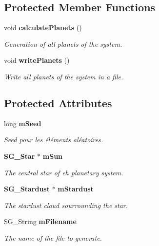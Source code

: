 \subsection*{Protected Member Functions}
\begin{CompactItemize}
\item 
void {\bf calculate\-Planets} ()\label{class_s_g___solar_system_b0}

\begin{CompactList}\small\item\em Generation of all planets of the system. \item\end{CompactList}\item 
void {\bf write\-Planets} ()\label{class_s_g___solar_system_b1}

\begin{CompactList}\small\item\em Write all planets of the system in a file. \item\end{CompactList}\end{CompactItemize}
\subsection*{Protected Attributes}
\begin{CompactItemize}
\item 
long {\bf m\-Seed}\label{class_s_g___solar_system_p0}

\begin{CompactList}\small\item\em Seed pour les \'{e}l\'{e}ments al\'{e}atoires. \item\end{CompactList}\item 
{\bf SG\_\-Star} $\ast$ {\bf m\-Sun}\label{class_s_g___solar_system_p1}

\begin{CompactList}\small\item\em The central star of eh planetary system. \item\end{CompactList}\item 
{\bf SG\_\-Stardust} $\ast$ {\bf m\-Stardust}\label{class_s_g___solar_system_p2}

\begin{CompactList}\small\item\em The stardust cloud sourrounding the star. \item\end{CompactList}\item 
SG\_\-String {\bf m\-Filename}\label{class_s_g___solar_system_p3}

\begin{CompactList}\small\item\em The name of the file to generate. \item\end{CompactList}\end{CompactItemize}


